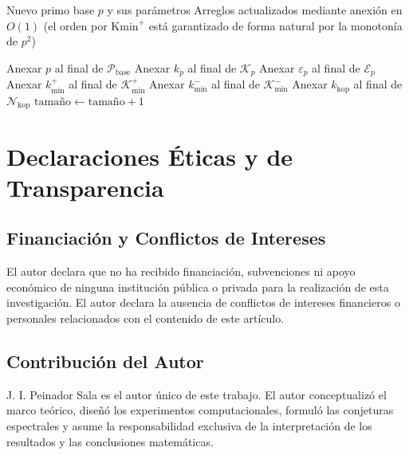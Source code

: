 \documentclass{article}
\numberwithin{equation}{section}
\theoremstyle{plain}
\theoremstyle{definition}
\begin{document}
\begin{algorithm}[htbp]
\caption{AnexarPrimoBasePM($p$, $k_p$, $\varepsilon_p$, $k_{\min}^+$, $k_{\min}^-$, $k_{\text{kop}}$)}
\label{alg:insert_primo_base_pm}
\begin{algorithmic}[1]
\Require Nuevo primo base $p$ y sus parámetros
\Ensure Arreglos actualizados mediante anexión en $O(1)$ (el orden por $\mathrm{Kmin}^+$ está garantizado de forma natural por la monotonía de $p^2$)

\State Anexar $p$ al final de $\mathcal{P}_{\text{base}}$
\State Anexar $k_p$ al final de $\mathcal{K}_p$
\State Anexar $\varepsilon_p$ al final de $\mathcal{E}_p$
\State Anexar $k_{\min}^+$ al final de $\mathcal{K}_{\min}^+$
\State Anexar $k_{\min}^-$ al final de $\mathcal{K}_{\min}^-$
\State Anexar $k_{\text{kop}}$ al final de $\mathcal{N}_{\text{kop}}$
\State $\text{tamaño} \gets \text{tamaño} + 1$
\end{algorithmic}
\end{algorithm}
\clearpage


\section*{Declaraciones Éticas y de Transparencia}

\subsection*{Financiación y Conflictos de Intereses}
El autor declara que no ha recibido financiación, subvenciones ni apoyo económico de ninguna institución pública o privada para la realización de esta investigación. El autor declara la ausencia de conflictos de intereses financieros o personales relacionados con el contenido de este artículo.

\subsection*{Contribución del Autor}
J. I. Peinador Sala es el autor único de este trabajo. El autor conceptualizó el marco teórico, diseñó los experimentos computacionales, formuló las conjeturas espectrales y asume la responsabilidad exclusiva de la interpretación de los resultados y las conclusiones matemáticas.
\end{document}

